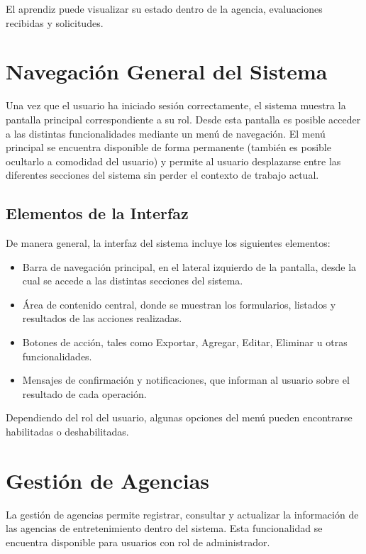 \documentclass[12pt,a4paper,spanish,oneside]{article}
\begin{document}
	El aprendiz puede visualizar su estado dentro de la agencia, evaluaciones recibidas y solicitudes.
	
	\section{Navegación General del Sistema}
	
	Una vez que el usuario ha iniciado sesión correctamente, el sistema muestra la pantalla principal correspondiente a su rol. Desde esta pantalla es posible acceder a las distintas funcionalidades mediante un menú de navegación. El menú principal se encuentra disponible de forma permanente (también es posible ocultarlo a comodidad del usuario) y permite al usuario desplazarse entre las diferentes secciones del sistema sin perder el contexto de trabajo actual.
	
	\subsection{Elementos de la Interfaz}
	
	De manera general, la interfaz del sistema incluye los siguientes elementos:
	
	\begin{itemize}
		\item Barra de navegación principal, en el lateral izquierdo de la pantalla, desde la cual se accede a las distintas secciones del sistema.
		\item Área de contenido central, donde se muestran los formularios, listados y resultados de las acciones realizadas.
		\item Botones de acción, tales como Exportar, Agregar, Editar, Eliminar u otras funcionalidades.
		\item Mensajes de confirmación y notificaciones, que informan al usuario sobre el resultado de cada operación.
	\end{itemize}
	
	Dependiendo del rol del usuario, algunas opciones del menú pueden encontrarse habilitadas o deshabilitadas.
	
	\section{Gestión de Agencias}
	
	La gestión de agencias permite registrar, consultar y actualizar la información de las agencias de entretenimiento dentro del sistema. Esta funcionalidad se encuentra disponible para usuarios con rol de administrador.
	
\end{document}
